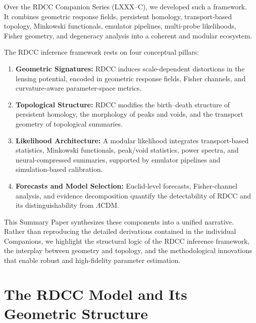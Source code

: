 \documentclass[11pt,a4paper]{article}
\begin{document}
Over the RDCC Companion Series (LXXX--C), we developed such a framework. It
combines geometric response fields, persistent homology, transport-based topology,
Minkowski functionals, emulator pipelines, multi-probe likelihoods, Fisher
geometry, and degeneracy analysis into a coherent and modular ecosystem.

The RDCC inference framework rests on four conceptual pillars:

\begin{enumerate}[leftmargin=1.2cm]
    \item \textbf{Geometric Signatures:}  
    RDCC induces scale-dependent distortions in the lensing potential, encoded in
    geometric response fields, Fisher channels, and curvature-aware parameter-space
    metrics.

    \item \textbf{Topological Structure:}  
    RDCC modifies the birth--death structure of persistent homology, the morphology
    of peaks and voids, and the transport geometry of topological summaries.

    \item \textbf{Likelihood Architecture:}  
    A modular likelihood integrates transport-based statistics, Minkowski
    functionals, peak/void statistics, power spectra, and neural-compressed
    summaries, supported by emulator pipelines and simulation-based calibration.

    \item \textbf{Forecasts and Model Selection:}  
    Euclid-level forecasts, Fisher-channel analysis, and evidence decomposition
    quantify the detectability of RDCC and its distinguishability from
    $\Lambda$CDM.
\end{enumerate}

This Summary Paper synthesizes these components into a unified narrative. Rather
than reproducing the detailed derivations contained in the individual Companions,
we highlight the structural logic of the RDCC inference framework, the interplay
between geometry and topology, and the methodological innovations that enable
robust and high-fidelity parameter estimation.


\section{The RDCC Model and Its Geometric Structure}
\end{document}
